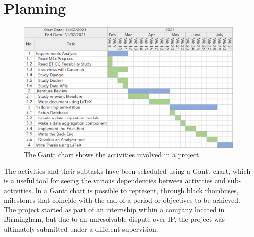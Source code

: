 \newpage
\section{Planning}

\begin{figure}[H]
	\centering
	\includegraphics[scale=0.7]{img/gantt.png}
	\caption{The Gantt chart shows the activities involved in a project.}
	\label{Introduction:Gantt Chart}
\end{figure}

The activities and their subtasks have been scheduled using a Gantt chart, which is a useful tool for seeing the various dependencies between activities and sub-activities. In a Gantt chart is possible to represent, through black rhombuses, milestones that coincide with the end of a period or objectives to be achieved. The project started as part of an internship within a company located in Birmingham, but due to an unresolvable dispute over IP, the project was ultimately submitted under a different supervision. 








